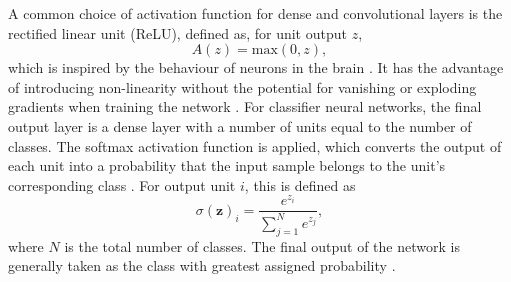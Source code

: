 \documentclass[12pt]{article}
\begin{document}
A common choice of activation function for dense and convolutional layers is the rectified linear unit (ReLU), defined as, for unit output $z$,
\begin{equation}
A(z)=\mathrm{max}(0, z), \label{relu}
\end{equation}
which is inspired by the behaviour of neurons in the brain \cite{Glorot11}. It has the advantage of introducing non-linearity without the potential for vanishing or exploding gradients when training the network \cite{Goodfellow16, Glorot11}. For classifier neural networks, the final output layer is a dense layer with a number of units equal to the number of classes. The softmax activation function is applied, which converts the output of each unit into a probability that the input sample belongs to the unit's corresponding class \cite{Goodfellow16}. For output unit $i$, this is defined as
\begin{equation}
\sigma(\bm{z})_i=\frac{e^{z_i}}{\sum_{j=1}^Ne^{z_j}}, \label{softmax}
\end{equation}
where $N$ is the total number of classes. The final output of the network is generally taken as the class with greatest assigned probability \cite{Goodfellow16}.
\end{document}
